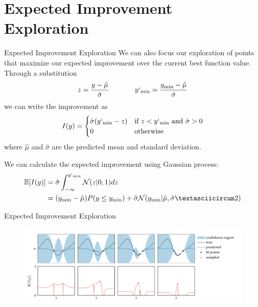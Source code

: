 \documentclass{beamer}
\begin{document}
\section{Expected Improvement Exploration}
\begin{frame}{Expected Improvement Exploration}
We can also focus our exploration of points that maximize our expected improvement over the current best function value.
Through a substitution
\begin{equation*}
    z = \frac{y-\hat{\mu}}{\hat{\sigma}} ~~~~~~~~~~~ y`_{\min} = \frac{y_{\min} - \hat{\mu}}{\hat{\sigma}}
\end{equation*}
we can write the improvement as
\begin{equation*}
    I(y) = 
    \begin{cases}
    \hat{\sigma} (y`_{\min} -z) & {\textrm{if}~} z<y`_{\min} {\textrm{~and~}} \hat{\sigma} >0 \\
    0 & {\textrm{otherwise}}\\
    \end{cases}
\end{equation*}
where $\hat{\mu}$ and $\hat{\sigma}$ are the predicted mean and standard deviation.

We can calculate the expected improvement using Gaussian process:
\begin{equation*}
\begin{split}
    \mathbb{E}[I(y)] &= \hat{\sigma} \int_{-\infty}^{y`_{\min}}  \mathcal{N}(z|0,1)dz\\
    & = (y_{\min} - \hat{\mu}) P (y \leq y_{\min}) + \hat{\sigma} \mathcal{N}(y_{\min} | \hat{\mu}, \hat{\sigma}ˆ2)
\end{split}
\end{equation*}

\end{frame}

\begin{frame}{Expected Improvement Exploration}

\begin{figure}
\centering
\includegraphics[width=125mm]{Figs/EI.jpeg}
\end{figure} 

\end{frame}
\end{document}
